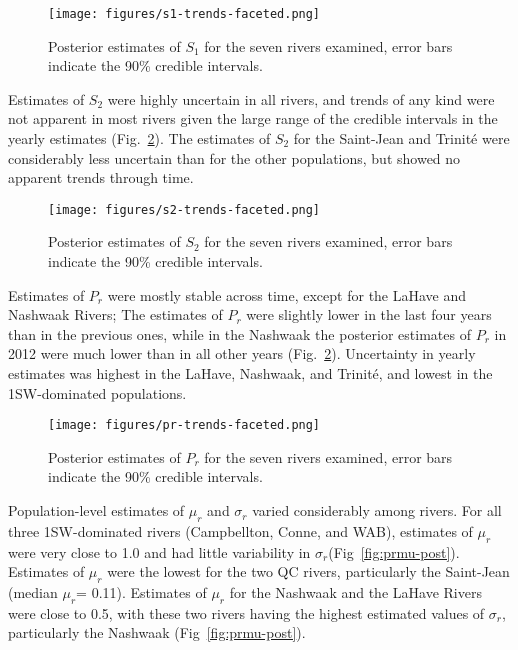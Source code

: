 \documentclass[12pt]{article}
\newcommand{\So}{$S_{1}$\xspace}
\newcommand{\St}{$S_{2}$\xspace}
\newcommand{\Pg}{$P_r$\xspace}
\newcommand{\prmu}{$\mu_r$\xspace}
\newcommand{\prsig}{$\sigma_r$\xspace}
\begin{document}
\begin{figure}[htbp] \centering
    \texttt{[image: figures/s1-trends-faceted.png]}
    \caption{Posterior estimates of \So for the seven rivers examined, error
        bars indicate the 90\% credible intervals.} \label{fig:s1-faceted}
\end{figure}

Estimates of \St were highly uncertain in all rivers, and trends of any kind
were not apparent in most rivers given the large range of the credible
intervals in the yearly estimates (Fig.~\ref{fig:s2-faceted}). The estimates
of \St for the Saint-Jean and Trinit\'{e} were considerably less uncertain
than for the other populations, but showed no apparent trends through time.

\begin{figure}[htbp] \centering
    \texttt{[image: figures/s2-trends-faceted.png]}
    \caption{Posterior estimates of \St for the seven rivers examined, error
        bars indicate the 90\% credible intervals.} \label{fig:s2-faceted}
\end{figure}

Estimates of \Pg were mostly stable across time, except for the LaHave and
Nashwaak Rivers; The estimates of \Pg were slightly lower in the last four
years than in the previous ones, while in the Nashwaak the posterior estimates
of \Pg in 2012 were much lower than in all other years
(Fig.~\ref{fig:s2-faceted}). Uncertainty in yearly estimates was highest in
the LaHave, Nashwaak, and Trinit\'{e}, and lowest in the 1SW-dominated
populations.

\begin{figure}[htbp] \centering
    \texttt{[image: figures/pr-trends-faceted.png]}
    \caption{Posterior estimates of \Pg for the seven rivers examined, error
        bars indicate the 90\% credible intervals.} \label{fig:pr-faceted}
\end{figure}

Population-level estimates of \prmu and \prsig varied considerably among rivers. For all
three 1SW-dominated rivers (Campbellton, Conne, and WAB), estimates of \prmu
were very close to 1.0 and had little variability in \prsig (Fig~\ref{fig:prmu-post}).
Estimates of \prmu were the lowest for the two QC rivers, particularly the Saint-Jean (median \prmu = 0.11).
Estimates of \prmu for the Nashwaak and the LaHave Rivers were close to 0.5, with these two rivers having 
the highest estimated values of \prsig, particularly the Nashwaak (Fig~\ref{fig:prmu-post}).
\end{document}
